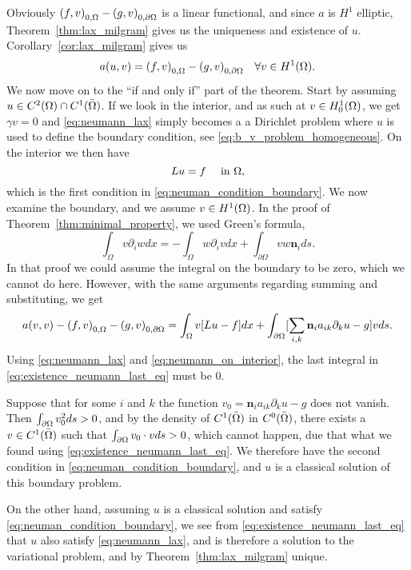 \begin{bev}
   Obviously $ {(f,v)}_{0,\Omega} - {(g,v)}_{0,\partial\Omega}$ is a linear functional, 
   and since $a$ is $H^1$ elliptic, Theorem~\ref{thm:lax_milgram} gives us the 
   uniqueness and existence of $u$.
   Corollary~\ref{cor:lax_milgram} gives us
   \begin{equation}
      a(u,v) = {(f,v)}_{0,\Omega} - {(g,v)}_{0,\partial\Omega} \quad \forall v \in H^1(\Omega). \label{eq:neumann_lax}
   \end{equation}
   We now move on to the ``if and only if'' part of the theorem. Start by 
   assuming $u \in C^2(\Omega)\cap C^1(\bar{\Omega})$.
   If we look in the interior, and as such at $v \in H^1_0(\Omega)$, we get $\gamma v=0$ 
   and \eqref{eq:neumann_lax} simply becomes a a Dirichlet problem where 
   $u$ is used to define the boundary condition, see \eqref{eq:b_v_problem_homogeneous}.
   On the interior we then have 
   \begin{equation}
    Lu = f \quad \text{ in }\Omega, \label{eq:neumann_on_interior}
   \end{equation} 
   which is the first condition in \eqref{eq:neuman_condition_boundary}.
   We now examine the boundary, and we assume $v\in H^1(\Omega)$.
   In the proof of Theorem~\ref{thm:minimal_property}, we used Green's formula,
    \begin{equation} %
        \int_\Omega v\partial_i w dx = -\int_\Omega w \partial_i v dx + \int_{\partial \Omega} v w \mathbf{n}_i ds.
    \end{equation}
   In that proof we could assume the integral on the boundary to be zero, which 
   we cannot do here. However, with the same arguments regarding summing and substituting, 
   we get
   \begin{equation}
      a(v,v) - {(f,v)}_{0,\Omega} - {(g,v)}_{0,\partial\Omega} = 
      \int_\Omega v[Lu - f] dx + \int_{\partial \Omega}
     [ \sum_{i,k}  \mathbf{n}_i a_{ik} \partial_k u-g]v ds.
     \label{eq:existence_neumann_last_eq}
   \end{equation}
   Using \eqref{eq:neumann_lax} and \eqref{eq:neumann_on_interior},
   the last integral in \eqref{eq:existence_neumann_last_eq} must be $0$.

   Suppose that for some $i$ and $k$ the function $v_0 = \mathbf{n}_i a_{ik} \partial_k u -g$ does 
   not vanish. Then $\int_{\partial\Omega}v_0^2ds>0$, and by the density of 
   $C^1(\bar{\Omega})$ in $C^0(\bar{\Omega})$, there exists a $v\in C^1(\bar{\Omega})$
   such that  $\int_{\partial\Omega}v_0\cdot vds>0$, which cannot happen, due that 
   what we found using \eqref{eq:existence_neumann_last_eq}. 
   We therefore have the second condition in \eqref{eq:neuman_condition_boundary},
   and $u$ is a classical solution of this boundary problem.

   On the other hand, assuming $u$ is a classical solution and satisfy \eqref{eq:neuman_condition_boundary},
   we see from \eqref{eq:existence_neumann_last_eq} that $u$ also satisfy 
   \eqref{eq:neumann_lax}, and is therefore a solution to the variational 
   problem, and by Theorem~\ref{thm:lax_milgram} unique.
\end{bev}


